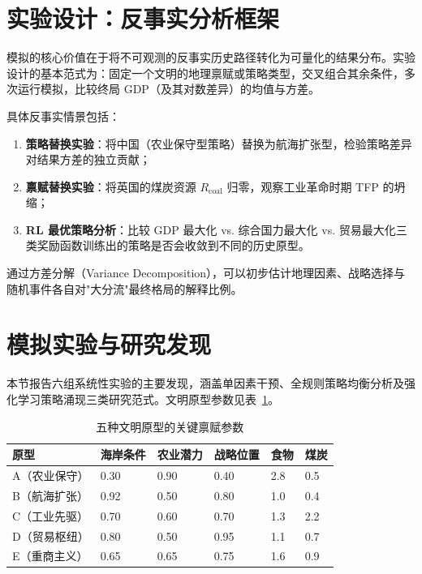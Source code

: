 \documentclass[12pt, a4paper]{article}
\begin{document}
\section{实验设计：反事实分析框架}

模拟的核心价值在于将不可观测的反事实历史路径转化为可量化的结果分布。实验设计的基本范式为：固定一个文明的地理禀赋或策略类型，交叉组合其余条件，多次运行模拟，比较终局 GDP（及其对数差异）的均值与方差。

具体反事实情景包括：
\begin{enumerate}
    \item \textbf{策略替换实验}：将中国（农业保守型策略）替换为航海扩张型，检验策略差异对结果方差的独立贡献；
    \item \textbf{禀赋替换实验}：将英国的煤炭资源 $R_{\text{coal}}$ 归零，观察工业革命时期 TFP 的坍缩；
    \item \textbf{RL 最优策略分析}：比较 GDP 最大化 vs. 综合国力最大化 vs. 贸易最大化三类奖励函数训练出的策略是否会收敛到不同的历史原型。
\end{enumerate}

通过方差分解（Variance Decomposition），可以初步估计地理因素、战略选择与随机事件各自对"大分流"最终格局的解释比例。

\section{模拟实验与研究发现}

本节报告六组系统性实验的主要发现，涵盖单因素干预、全规则策略均衡分析及强化学习策略涌现三类研究范式。文明原型参数见表~\ref{tab:archetypes}。

\begin{table}[H]
\centering
\caption{五种文明原型的关键禀赋参数}
\label{tab:archetypes}
\begin{tabularx}{\textwidth}{lXXXXX}
\toprule
原型 & 海岸条件 & 农业潜力 & 战略位置 & 食物 & 煤炭 \\
\midrule
A（农业保守） & 0.30 & 0.90 & 0.40 & 2.8 & 0.5 \\
B（航海扩张） & 0.92 & 0.50 & 0.80 & 1.0 & 0.4 \\
C（工业先驱） & 0.70 & 0.60 & 0.70 & 1.3 & 2.2 \\
D（贸易枢纽） & 0.80 & 0.50 & 0.95 & 1.1 & 0.7 \\
E（重商主义） & 0.65 & 0.65 & 0.75 & 1.6 & 0.9 \\
\bottomrule
\end{tabularx}
\end{table}
\end{document}
